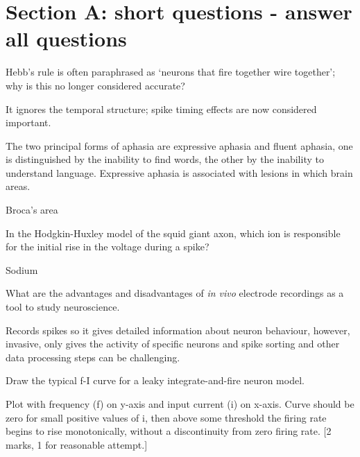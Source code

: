 \documentclass{cs-uob-exam}
\begin{document}
\maketitle
        
%


\section*{Section A: short questions - answer all questions}

\begin{questions} 


\question Hebb's rule is often paraphrased as \lq{}neurons that fire together wire together\rq{}; why is this no longer considered accurate?
\begin{solution}
It ignores the temporal structure; spike timing effects are now considered important.
\end{solution}
  

\item The two principal forms of aphasia are expressive aphasia and
  fluent aphasia, one is distinguished by the inability to find words,
  the other by the inability to understand language. Expressive aphasia is 
  associated with lesions in which brain areas.
\begin{solution}
Broca's area 
\end{solution}


\item In the Hodgkin-Huxley model of the squid giant axon, which ion
  is responsible for the initial rise in the voltage during a spike?
\begin{solution}
Sodium
\end{solution}

\question What are the advantages and disadvantages of \textsl{in vivo} electrode recordings as a tool to study neuroscience.
\begin{solution}
Records spikes so it gives detailed information about neuron
behaviour, however, invasive, only gives the activity of specific
neurons and spike sorting and other data processing steps can be
challenging.
\end{solution}

\question Draw the typical f-I curve for a leaky integrate-and-fire neuron model.
\begin{solution}
Plot with frequency (f) on y-axis and input current (i) on x-axis. Curve should be zero for small positive values of i, then above some threshold the firing rate begins to rise monotonically, without a discontinuity from zero firing rate. [2 marks, 1 for reasonable attempt.]
\end{solution}


\end{questions}
\end{document}
